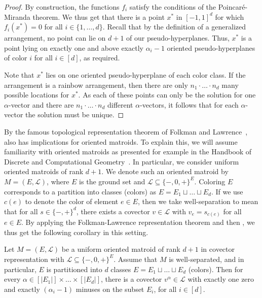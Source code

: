 \documentclass[a4paper,UKenglish,cleveref, autoref, thm-restate, nolineno]{socg-lipics-v2021}
\begin{document}
\begin{proof}
By construction, the functions $f_i$ satisfy the conditions of the Poincar\'{e}-Miranda theorem.
We thus get that there is a point $x^*$ in $[-1,1]^d$ for which $f_i(x^*)=0$ for all $i\in\{1,\ldots,d\}$.
Recall that by the definition of a generalized arrangement, no point can lie on $d + 1$ of our pseudo-hyperplanes. Thus, $x^*$ is a point lying on exactly one and above exactly $\alpha_i - 1$ oriented pseudo-hyperplanes of color $i$ for all $i \in [d]$, as required.

Note that $x^*$ lies on one oriented pseudo-hyperplane of each color class. If the arrangement is a rainbow arrangement, then there are only $n_1\cdot\ldots\cdot n_d$ many possible locations for $x^*$. As each of these points can only be the solution for one $\alpha$-vector and there are $n_1\cdot\ldots\cdot n_d$ different $\alpha$-vectors, it follows that for each $\alpha$-vector the solution must be unique.
\end{proof}

By the famous topological representation theorem of Folkman and Lawrence~\cite{folkmanOrientedMatroids1978},  also has implications for oriented matroids. To explain this, we will assume familiarity with oriented matroids as presented for example in the Handbook of Discrete and Computational Geometry~\cite{richter-gebertOrientedMatroids1997}. In particular, we consider uniform oriented matroids of rank $d + 1$. We denote such an oriented matroid by $M = (E, \mathcal{L})$, where $E$ is the ground set and $\mathcal{L} \subseteq \{-, 0, +\}^E$. Coloring $E$ corresponds to a partition into classes (colors) as $E = E_1 \sqcup \dots \sqcup E_d$. If we use $c(e)$ to denote the color of element $e \in E$, then we take well-separation to mean that for all $s \in \{- , + \}^d$, there exists a covector $v \in \mathcal{L}$ with $v_e = s_{c(e)}$ for all $e \in E$. By applying the Folkman-Lawrence representation theorem and then , we thus get the following corollary in this setting. 

\begin{corollary}\label{cor:matroids}
    Let $M = (E, \mathcal{L})$ be a uniform oriented matroid of rank $d + 1$ in covector representation with $\mathcal{L} \subseteq \{-, 0, +\}^E$. Assume that $M$ is well-separated, and in particular, $E$ is partitioned into $d$ classes $E = E_1 \sqcup \dots \sqcup E_d$ (colors). Then for every $\alpha \in [|E_1|] \times \dots \times [|E_d|]$, there is a covector $v^{\alpha} \in \mathcal{L}$ with exactly one zero and exactly $(\alpha_i - 1)$ minuses on the subset $E_i$, for all $i \in [d]$. 
\end{corollary}
\end{document}

